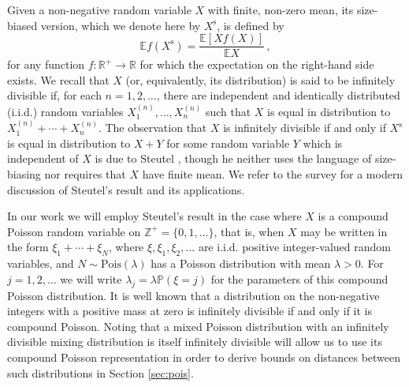 \documentclass[12pt]{article}
\begin{document}
Given a non-negative random variable $X$ with finite, non-zero mean, its size-biased version, which we denote here by $X^\text{s}$, is defined by
\begin{equation}\label{eq:sb_def}
\mathbb{E}f(X^\text{s})=\frac{\mathbb{E}[Xf(X)]}{\mathbb{E}X}\,,
\end{equation}    
for any function $f:\mathbb{R}^+\to\mathbb{R}$ for which the expectation on the right-hand side exists. We recall that $X$ (or, equivalently, its distribution) is said to be infinitely divisible if, for each $n=1,2,\ldots$, there are independent and identically distributed (i.i.d.) random variables $X_1^{(n)},\ldots,X_n^{(n)}$ such that $X$ is equal in distribution to $X_1^{(n)}+\cdots+X_n^{(n)}$. The observation that $X$ is infinitely divisible if and only if $X^\text{s}$ is equal in distribution to $X+Y$ for some random variable $Y$ which is independent of $X$ is due to Steutel \cite{steutel73}, though he neither uses the language of size-biasing nor requires that $X$ have finite mean. We refer to the survey \cite{arratia19} for a modern discussion of Steutel's result and its applications.

In our work we will employ Steutel's result in the case where $X$ is a compound Poisson random variable on $\mathbb{Z}^+=\{0,1,\ldots\}$, that is, when $X$ may be written in the form $\xi_1+\cdots+\xi_N$, where $\xi,\xi_1,\xi_2,\ldots$ are i.i.d$.$ positive integer-valued random variables, and $N\sim\text{Pois}(\lambda)$ has a Poisson distribution with mean $\lambda>0$. For $j=1,2,\ldots$ we will write $\lambda_j=\lambda\mathbb{P}(\xi=j)$ for the parameters of this compound Poisson distribution. It is well known that a distribution on the non-negative integers with a positive mass at zero is infinitely divisible if and only if it is compound Poisson. Noting that a mixed Poisson distribution with an infinitely divisible mixing distribution is itself infinitely divisible \cite{karlis05} will allow us to use its compound Poisson representation in order to derive bounds on distances between such distributions in Section \ref{sec:pois}.
\end{document}

